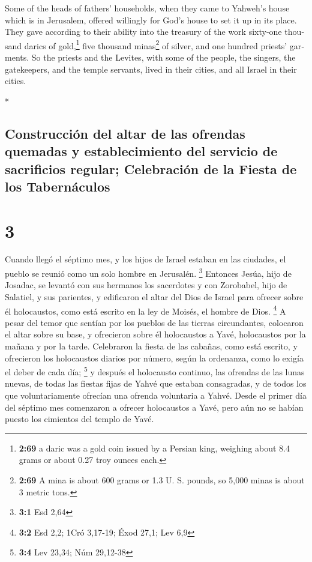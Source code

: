\begin{paracol}{2}
\begin{otherlanguage}{english}
 Some of the heads of fathers' households, when they came
to Yahweh's house which is in Jerusalem, offered willingly for God's
house to set it up in its place.  They gave according to
their ability into the treasury of the work sixty-one thousand darics of
gold,\footnote{\textbf{2:69} a daric was a gold coin issued by a Persian
  king, weighing about 8.4 grams or about 0.27 troy ounces each.} five
thousand minas\footnote{\textbf{2:69} A mina is about 600 grams or 1.3
  U. S. pounds, so 5,000 minas is about 3 metric tons.} of silver, and
one hundred priests' garments.  So the priests and the
Levites, with some of the people, the singers, the gatekeepers, and the
temple servants, lived in their cities, and all Israel in their cities.

\end{otherlanguage}

\switchcolumn[0]*

\hypertarget{construcciuxf3n-del-altar-de-las-ofrendas-quemadas-y-establecimiento-del-servicio-de-sacrificios-regular-celebraciuxf3n-de-la-fiesta-de-los-tabernuxe1culos}{%
\subsection{Construcción del altar de las ofrendas quemadas y
establecimiento del servicio de sacrificios regular; Celebración de la
Fiesta de los
Tabernáculos}\label{construcciuxf3n-del-altar-de-las-ofrendas-quemadas-y-establecimiento-del-servicio-de-sacrificios-regular-celebraciuxf3n-de-la-fiesta-de-los-tabernuxe1culos}}

\hypertarget{section-4}{%
\section{3}\label{section-4}}

 Cuando llegó el séptimo mes, y los hijos de Israel
estaban en las ciudades, el pueblo se reunió como un solo hombre en
Jerusalén. \footnote{\textbf{3:1} Esd 2,64}  Entonces
Jesúa, hijo de Josadac, se levantó con sus hermanos los sacerdotes y con
Zorobabel, hijo de Salatiel, y sus parientes, y edificaron el altar del
Dios de Israel para ofrecer sobre él holocaustos, como está escrito en
la ley de Moisés, el hombre de Dios. \footnote{\textbf{3:2} Esd 2,2;
  1Cró 3,17-19; Éxod 27,1; Lev 6,9}  A pesar del temor que
sentían por los pueblos de las tierras circundantes, colocaron el altar
sobre su base, y ofrecieron sobre él holocaustos a Yavé, holocaustos por
la mañana y por la tarde.  Celebraron la fiesta de las
cabañas, como está escrito, y ofrecieron los holocaustos diarios por
número, según la ordenanza, como lo exigía el deber de cada día;
\footnote{\textbf{3:4} Lev 23,34; Núm 29,12-38}  y después
el holocausto continuo, las ofrendas de las lunas nuevas, de todas las
fiestas fijas de Yahvé que estaban consagradas, y de todos los que
voluntariamente ofrecían una ofrenda voluntaria a Yahvé. 
Desde el primer día del séptimo mes comenzaron a ofrecer holocaustos a
Yavé, pero aún no se habían puesto los cimientos del templo de Yavé.


\end{paracol}
